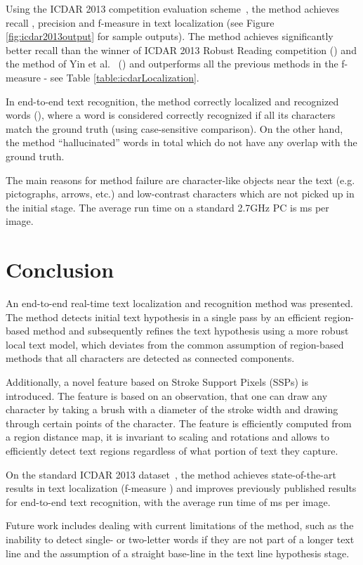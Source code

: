 \documentclass[conference]{IEEEtran}
\begin{document}
Using the ICDAR 2013 competition evaluation scheme~\cite{ICDAR2013}, the method achieves recall , precision  and f-measure  in text localization (see Figure \ref{fig:icdar2013output} for sample outputs). The method achieves significantly better recall than the winner of ICDAR 2013 Robust Reading competition () and the method of Yin et al.~\cite{Yin-TPAMI2013} () and outperforms all the previous methods in the f-measure - see Table \ref{table:icdarLocalization}.

In end-to-end text recognition, the method correctly localized and recognized  words (), where a word is considered correctly recognized if all its characters match the ground truth (using case-sensitive comparison). On the other hand, the method ``hallucinated''  words in total which do not have any overlap with the ground truth.

The main reasons for method failure are character-like objects near the text (e.g. pictographs, arrows, etc.) and low-contrast characters which are not picked up in the initial stage. The average run time on a standard 2.7GHz PC is ms per image.

\vspace{-10pt}
\section{Conclusion}
\label{sec:conclusion}
An end-to-end real-time text localization and recognition method was presented. The method detects initial text hypothesis in a single pass by an efficient region-based method and subsequently refines the text hypothesis using a more robust local text model, which deviates from the common assumption of region-based methods that all characters are detected as connected components.

Additionally, a novel feature based on Stroke Support Pixels (SSPs) is introduced. The feature is based on an observation, that one can draw any character by taking a brush with a diameter of the stroke width and drawing through certain points of the character. The feature is efficiently computed from a region distance map, it is invariant to scaling and rotations and allows to efficiently detect text regions regardless of what portion of text they capture.

On the standard ICDAR 2013 dataset~\cite{ICDAR2013}, the method achieves state-of-the-art results in text localization (f-measure ) and improves previously published results for end-to-end text recognition, with the average run time of ms per image.

Future work includes dealing with current limitations of the method, such as the inability to detect single- or two-letter words if they are not part of a longer text line and the assumption of a straight base-line in the text line hypothesis stage.

\vspace{-10pt}


\end{document}
